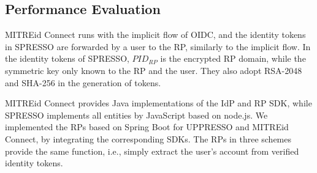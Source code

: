 \subsection{Performance Evaluation}
\label{sec:evaluation}




MITREid Connect runs with the implicit flow of OIDC,
 and the identity tokens in SPRESSO are forwarded by a user to the RP,
    similarly to the implicit flow. %
In the identity tokens of SPRESSO, $PID_{RP}$ is the encrypted RP domain, while the symmetric key only known to the RP and the user.
They also adopt RSA-2048 and SHA-256  in the generation of tokens.


MITREid Connect provides Java implementations of the IdP and
RP SDK,
 while SPRESSO implements all entities by JavaScript based on node.js.
We implemented the RPs based on Spring Boot for UPPRESSO and MITREid Connect, by integrating the corresponding SDKs.
The RPs in three schemes provide the same function, i.e.,
     simply extract the user's account from verified identity tokens.

